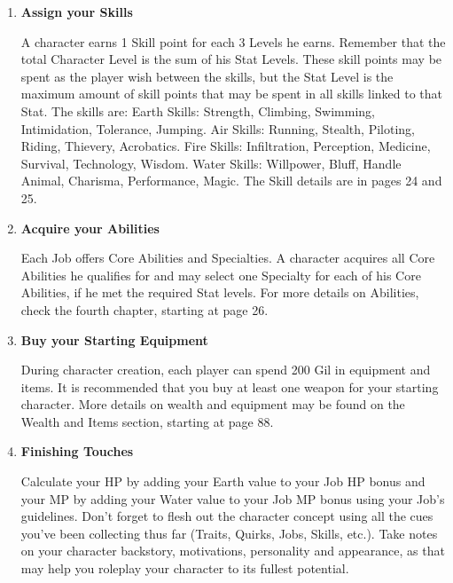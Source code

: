 \begin{enumerate}
\item \textbf{Assign your Skills}

A character earns 1 Skill point for each 3 Levels he
earns. Remember that the total Character Level is
the sum of his Stat Levels. These skill points may
be spent as the player wish between the skills, but
the Stat Level is the maximum amount of skill
points that may be spent in all skills linked to that
Stat. The skills are:
Earth Skills: Strength, Climbing, Swimming,
Intimidation, Tolerance, Jumping.
Air Skills: Running, Stealth, Piloting, Riding,
Thievery, Acrobatics.
Fire Skills: Infiltration, Perception, Medicine,
Survival, Technology, Wisdom.
Water Skills: Willpower, Bluff, Handle Animal,
Charisma, Performance, Magic.
The Skill details are in pages 24 and 25.

\item \textbf{Acquire your Abilities}

Each Job offers Core Abilities and Specialties. A
character acquires all Core Abilities he qualifies for
and may select one Specialty for each of his Core
Abilities, if he met the required Stat levels. For
more details on Abilities, check the fourth chapter,
starting at page 26.

\item \textbf{Buy your Starting Equipment}

During character creation, each player can
spend 200 Gil in equipment and items. It is
recommended that you buy at least one weapon
for your starting character. More details on wealth
and equipment may be found on the Wealth and
Items section, starting at page 88.

\item \textbf{Finishing Touches}

Calculate your HP by adding your Earth value
to your Job HP bonus and your MP by adding your
Water value to your Job MP bonus using your Job's
guidelines. Don't forget to flesh out the character
concept using all the cues you've been collecting
thus far (Traits, Quirks, Jobs, Skills, etc.). Take
notes on your character backstory, motivations,
personality and appearance, as that may help you
roleplay your character to its fullest potential.

\end{enumerate}

